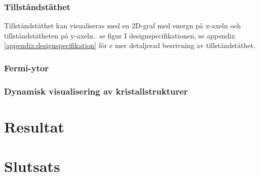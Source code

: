\documentclass[a4paper,12pt]{article}
\begin{document}
\subsubsection{Tillståndstäthet}
Tillståndstäthet kan visualiseras med en 2D-graf med energn på x-axeln och tillståndstätheten på y-axeln.. se figur %
I designspecifikationen, se appendix \ref{appendix:designspecifikation} för e mer detaljerad besrivning av tillståndstäthet.

\subsubsection{Fermi-ytor}

\subsubsection{Dynamisk visualisering av kristallstrukturer}



\section{Resultat}

\section{Slutsats}



\newpage
{}
\printbibliography{}
\end{document}
